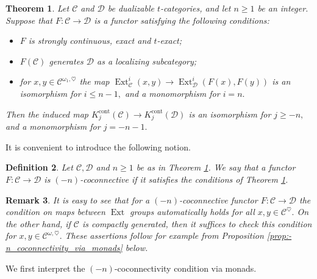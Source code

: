 \documentclass[11pt,leqno]{amsart}
\newtheorem{theo}{Theorem}[section]
\newtheorem{defi}[theo]{Definition}
\newtheorem{remark}[theo]{Remark}
\numberwithin{equation}{section}
\newcommand{\cont}{\operatorname{cont}}
\newcommand{\cD}{{\mathcal D}}
\newcommand{\cC}{{\mathcal C}}
\newcommand{\Ext}{\operatorname{Ext}}
\begin{document}
\begin{theo}\label{th:coconnectivity_estimates}
Let $\cC$ and $\cD$ be dualizable $t$-categories, and let $n\geq 1$ be an integer. Suppose that $F:\cC\to\cD$ is a functor satisfying the following conditions:
\begin{itemize}
	\item $F$ is strongly continuous, exact and $t$-exact;
	\item $F(\cC)$ generates $\cD$ as a localizing subcategory;
	\item for $x,y\in\cC^{\omega_1,\heartsuit}$ the map $\Ext^i_{\cC}(x,y)\to \Ext^i_{\cD}(F(x),F(y))$ is an isomorphism for $i\leq n-1,$ and a monomorphism for $i=n.$ 
\end{itemize}
Then the induced map $K_j^{\cont}(\cC)\to K_j^{\cont}(\cD)$ is an isomorphism for $j\geq -n,$ and a monomorphism for $j=-n-1.$
\end{theo}

It is convenient to introduce the following notion.

\begin{defi}\label{def:-n_coconnective_functor} Let $\cC,\cD$ and $n\geq 1$ be as in Theorem \ref{th:coconnectivity_estimates}. We say that a functor $F:\cC\to\cD$ is $(-n)$-coconnective if it satisfies the conditions of Theorem \ref{th:coconnectivity_estimates}.\end{defi}



\begin{remark}It is easy to see that for a $(-n)$-coconnective functor $F:\cC\to\cD$ the condition on maps between $\Ext$ groups automatically holds for all $x,y\in\cC^{\heartsuit}.$ On the other hand, if $\cC$ is compactly generated, then it suffices to check this condition for $x,y\in\cC^{\omega,\heartsuit}.$ These assertions follow for example from Proposition \ref{prop:-n_coconnectivity_via_monads} below.\end{remark}

We first interpret the $(-n)$-coconnectivity condition via monads.
\end{document}
